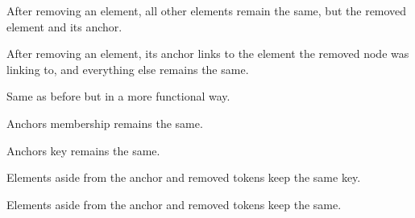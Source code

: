 \begin{theorem}
  \label{thm:MUList.Properties.Removes_others}
  \leanok
  After removing an element, all other elements remain the same, but the removed element and its anchor.
  \end{theorem} 
  
\begin{theorem}
  \label{thm:MUList.Properties.Removes_update_anch_mem_and_key}
  \leanok
  After removing an element, its anchor links to the element the removed node
was linking to, and everything else remains the same.
  \end{theorem} 

\begin{theorem}
  \label{thm:MUList.Properties.Removes_update_anch_mem_and_key'}
  \leanok
  Same as before but in a more functional way.
  \end{theorem} 

\begin{theorem}
  \label{thm:MUList.Properties.Removes_update_anch_mem}
  \leanok
  Anchors membership remains the same.
  \end{theorem} 

\begin{theorem}
  \label{thm:MUList.Properties.Removes_same_anch_key}
  \leanok
  Anchors key remains the same.
  \end{theorem} 

\begin{theorem}
  \label{thm:MUList.Properties.Removes_others_keys}
  \leanok
  Elements aside from the anchor and removed tokens keep the same key.
  \end{theorem} 

\begin{theorem}
  \label{thm:MUList.Properties.Removes_others_mem}
  \leanok
  Elements aside from the anchor and removed tokens keep the same.
  \end{theorem} 

